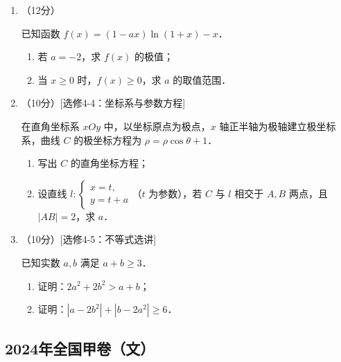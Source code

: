 \begin{description}
\begin{enumerate}[leftmargin=5pt]
        \item （12分）

        已知函数 $f(x)=(1-ax)\ln(1+x)-x$．

        \begin{enumerate}[label=(\arabic*)]
            \item 若 $a=-2$，求 $f(x)$ 的极值；
            \item 当 $x\geqslant0$ 时，$f(x)\geqslant0$，求 $a$ 的取值范围．
        \end{enumerate}

        \item （10分）[选修4-4：坐标系与参数方程]

        在直角坐标系 $xOy$ 中，以坐标原点为极点，$x$ 轴正半轴为极轴建立极坐标系，曲线 $C$ 的极坐标方程为 $\rho=\rho\cos\theta+1$．

        \begin{enumerate}[label=(\arabic*)]
            \item 写出 $C$ 的直角坐标方程；
            \item 设直线 $l:\begin{cases}x=t,\\y=t+a\end{cases}$（$t$ 为参数），若 $C$ 与 $l$ 相交于 $A,B$ 两点，且 $|AB|=2$，求 $a$．
        \end{enumerate}

        \item （10分）[选修4-5：不等式选讲]

        已知实数 $a,b$ 满足 $a+b\geqslant3$．

        \begin{enumerate}[label=(\arabic*)]
            \item 证明：$2a^2+2b^2>a+b$；
            \item 证明：$|a-2b^2|+|b-2a^2|\geqslant6$．
        \end{enumerate}
    \end{enumerate}
\end{description}
\clearpage


\subsection{2024年全国甲卷（文）}\label{gk:2024年全国甲卷（文）}

